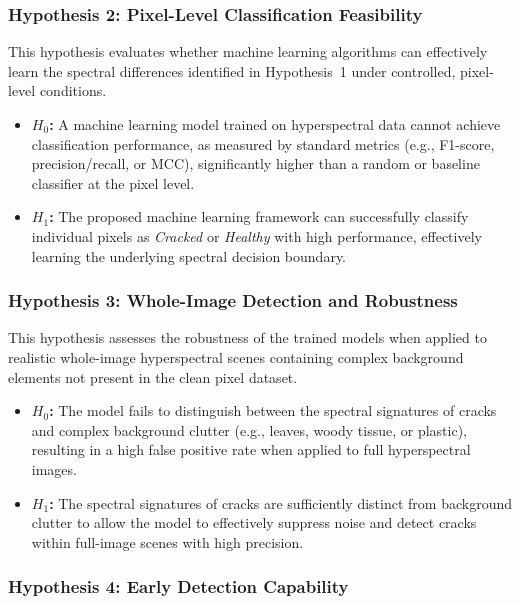 \subsubsection{Hypothesis 2: Pixel-Level Classification Feasibility}
\label{hyp:pixel_level_feasibility}

\noindent
This hypothesis evaluates whether machine learning algorithms can effectively learn the spectral differences identified in Hypothesis~1 under controlled, pixel-level conditions.

\begin{itemize}
    \item \textbf{$H_0$:} A machine learning model trained on hyperspectral data cannot achieve classification performance, as measured by standard metrics (e.g., F1-score, precision/recall, or MCC), significantly higher than a random or baseline classifier at the pixel level.
    \item \textbf{$H_1$:} The proposed machine learning framework can successfully classify individual pixels as \textit{Cracked} or \textit{Healthy} with high performance, effectively learning the underlying spectral decision boundary.
\end{itemize}

\subsubsection{Hypothesis 3: Whole-Image Detection and Robustness}
\label{hyp:whole_image_robustness}

\noindent
This hypothesis assesses the robustness of the trained models when applied to realistic whole-image hyperspectral scenes containing complex background elements not present in the clean pixel dataset.

\begin{itemize}
    \item \textbf{$H_0$:} The model fails to distinguish between the spectral signatures of cracks and complex background clutter (e.g., leaves, woody tissue, or plastic), resulting in a high false positive rate when applied to full hyperspectral images.
    \item \textbf{$H_1$:} The spectral signatures of cracks are sufficiently distinct from background clutter to allow the model to effectively suppress noise and detect cracks within full-image scenes with high precision.
\end{itemize}

\subsubsection{Hypothesis 4: Early Detection Capability}
\label{hyp:early_detection}

